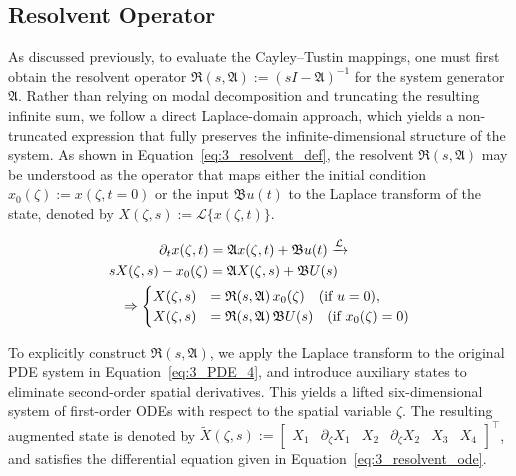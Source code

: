 \subsection{Resolvent Operator} \label{sec:3_4_1_resolvent}

As discussed previously, to evaluate the Cayley--Tustin mappings, one must first obtain the resolvent operator $\mathfrak{R}(s, \mathfrak{A}) := (sI - \mathfrak{A})^{-1}$ for the system generator $\mathfrak{A}$. Rather than relying on modal decomposition and truncating the resulting infinite sum, we follow a direct Laplace-domain approach\autocite{Khatibi2021Model, Moadeli2025Model}, which yields a non-truncated expression that fully preserves the infinite-dimensional structure of the system. As shown in Equation~\eqref{eq:3_resolvent_def}, the resolvent $\mathfrak{R}(s, \mathfrak{A})$ may be understood as the operator that maps either the initial condition $x_0(\zeta) := x(\zeta, t=0)$ or the input $\mathfrak{B} u(t)$ to the Laplace transform of the state, denoted by $X(\zeta, s) := \mathcal{L}\{x(\zeta, t)\}$.


\begin{equation} \label{eq:3_resolvent_def}
\begin{aligned}
    &\hspace{3.6em}\partial_t x(\zeta, t) = \mathfrak{A} x(\zeta, t) + \mathfrak{B} u(t) \xrightarrow{\mathcal{L}} \\
    &s X(\zeta, s) - x_0(\zeta) = \mathfrak{A} X(\zeta, s) + \mathfrak{B} U(s) \\
    &\hspace{0.8em}\Rightarrow \begin{cases}
        X(\zeta, s) &= \mathfrak{R}(s, \mathfrak{A})\, x_0(\zeta) \quad \text{(if $u = 0$)}, \\
        X(\zeta, s) &= \mathfrak{R}(s, \mathfrak{A})\, \mathfrak{B} U(s) \quad \text{(if $x_0(\zeta) = 0$)}
    \end{cases}
\end{aligned}
\end{equation}

To explicitly construct $\mathfrak{R}(s, \mathfrak{A})$, we apply the Laplace transform to the original PDE system in Equation~\eqref{eq:3_PDE_4}, and introduce auxiliary states to eliminate second-order spatial derivatives. This yields a lifted six-dimensional system of first-order ODEs with respect to the spatial variable $\zeta$. The resulting augmented state is denoted by $\tilde{X}(\zeta, s) := \begin{bmatrix} X_1 & \partial_\zeta X_1 & X_2 & \partial_\zeta X_2 & X_3 & X_4 \end{bmatrix}^\top$, and satisfies the differential equation given in Equation~\eqref{eq:3_resolvent_ode}.

